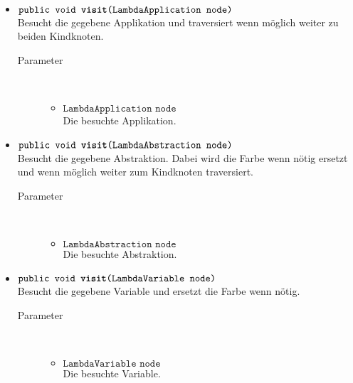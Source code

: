 \begin{description}
\begin{itemize}
		\item $\texttt{public void \textbf{visit}(LambdaApplication node)}$ \\ Besucht die gegebene Applikation und traversiert wenn möglich weiter zu beiden Kindknoten.
		\begin{description}
			\item[Parameter] \hfill \\
			\vspace{-.8cm}
			\begin{itemize}
				\item $\texttt{LambdaApplication node}$ \\ Die besuchte Applikation.
			\end{itemize}
		\end{description}
		
		\item $\texttt{public void \textbf{visit}(LambdaAbstraction node)}$ \\ Besucht die gegebene Abstraktion. Dabei wird die Farbe wenn nötig ersetzt und wenn möglich weiter zum Kindknoten traversiert.
		\begin{description}
			\item[Parameter] \hfill \\
			\vspace{-.8cm}
			\begin{itemize}
				\item $\texttt{LambdaAbstraction node}$ \\ Die besuchte Abstraktion.
			\end{itemize}
		\end{description}
		
		\item $\texttt{public void \textbf{visit}(LambdaVariable node)}$ \\ Besucht die gegebene Variable und ersetzt die Farbe wenn nötig.
		\begin{description}
			\item[Parameter] \hfill \\
			\vspace{-.8cm}
			\begin{itemize}
				\item $\texttt{LambdaVariable node}$ \\ Die besuchte Variable.
			\end{itemize}
		\end{description}
	\end{itemize}
\end{description}


